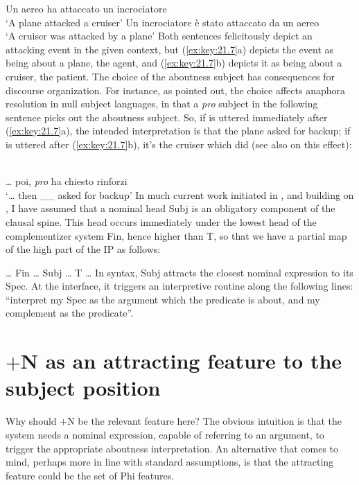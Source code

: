 \documentclass[output=paper]{langsci/langscibook}
\begin{document}
\begin{exe}
\ea%
\label{ex:key:21.7}
    \ea Un aereo ha attaccato un incrociatore\\
         ‘A plane   attacked      a cruiser’
    \ex Un incrociatore è stato attaccato  da un aereo\\
         ‘A cruiser          was attacked       by a plane’
    \z
\z
%
Both sentences felicitously depict an attacking event in the given context, but
(\ref{ex:key:21.7}a) depicts the event as being about a plane, the agent, and
(\ref{ex:key:21.7}b) depicts it as being about a cruiser, the patient. The
choice of the aboutness subject has consequences for discourse organization.
For instance, as \citet{Calabrese1986} pointed out, the choice affects anaphora
resolution in null subject languages, in that a \emph{pro} subject in the
following sentence picks out the aboutness subject. So, if  is
uttered immediately after (\ref{ex:key:21.7}a), the intended interpretation is
that the plane asked for backup; if  is uttered after
(\ref{ex:key:21.7}b), it’s the cruiser which did (see also
\citealt{BellettiEtAl2007} on this effect):

\ea%
    \label{ex:key:21.8}\\
    \dots{} poi, \emph{pro} ha chiesto rinforzi\\
    ‘\dots{} then \_\_ asked for backup’
\z
%
In much current work initiated in \citet{rizzicriterial}, and building on
\citet{Cardinaletti:2004a}, I have assumed that a nominal head Subj is an
obligatory component of the clausal spine. This head occurs immediately under
the lowest head of the complementizer system Fin, hence higher than T, so that
we have a partial map of the high part of the IP as follows:

\ea%
    \label{ex:key:21.9}
    \dots{} Fin \dots{} Subj\tss{[$+$N]} \dots{} T \dots{}
\z
%
In syntax, Subj\tss{[$+$N]} attracts the closest nominal expression to its Spec.
At the interface, it triggers an interpretive routine along the following
lines: “interpret my Spec as the argument which the predicate is about, and my
complement as the predicate”.

\section{$+$N as an attracting feature to the subject position}

Why should $+$N be the relevant feature here? The obvious intuition is that the
system needs a nominal expression, capable of referring to an argument, to
trigger the appropriate aboutness interpretation. An alternative that comes to
mind, perhaps more in line with standard assumptions, is that the attracting
feature could be the set of Phi features.


\end{exe}
\end{document}
